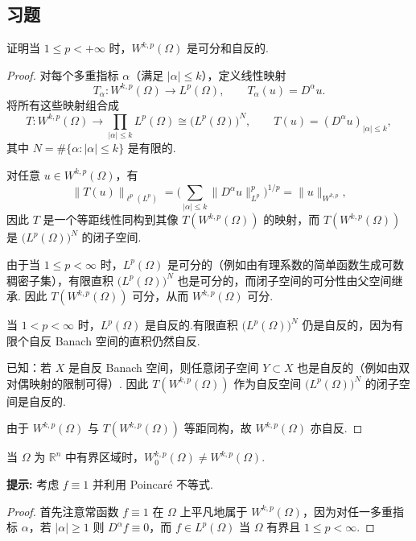 \documentclass[lang=cn,newtx,10pt,scheme=chinese,thmcnt=chapter]{elegantbook}
\begin{document}
\subsection{习题}

\begin{problemset}

\item 证明当 \(1 \leqslant p < +\infty\) 时，\({W}^{k,p}(\Omega)\) 是可分和自反的.
\begin{proof}
对每个多重指标 $\alpha$（满足 $|\alpha| \le k$），定义线性映射
\[
T_\alpha : W^{k,p}(\Omega) \to L^p(\Omega), \qquad T_\alpha(u) = D^\alpha u.
\]
将所有这些映射组合成
\[
T : W^{k,p}(\Omega) \to \prod_{|\alpha| \le k} L^p(\Omega) \cong \big(L^p(\Omega)\big)^N, 
\qquad T(u) = (D^\alpha u)_{|\alpha| \le k},
\]
其中 $N = \#\{\alpha : |\alpha| \le k\}$ 是有限的.

对任意 $u \in W^{k,p}(\Omega)$，有
\[
\|T(u)\|_{\ell^p(L^p)} 
= \Big( \sum_{|\alpha| \le k} \| D^\alpha u \|_{L^p}^p \Big)^{1/p} 
= \|u\|_{W^{k,p}},
\]
因此 $T$ 是一个等距线性同构到其像 $T(W^{k,p}(\Omega))$ 的映射，而 $T(W^{k,p}(\Omega))$ 是 $\big(L^p(\Omega)\big)^N$ 的闭子空间.

由于当 $1 \le p < \infty$ 时，$L^p(\Omega)$ 是可分的（例如由有理系数的简单函数生成可数稠密子集），有限直积 $\big(L^p(\Omega)\big)^N$ 也是可分的，而闭子空间的可分性由父空间继承.  
因此 $T(W^{k,p}(\Omega))$ 可分，从而 $W^{k,p}(\Omega)$ 可分.

当 $1 < p < \infty$ 时，$L^p(\Omega)$ 是自反的.有限直积 $\big(L^p(\Omega)\big)^N$ 仍是自反的，因为有限个自反 Banach 空间的直积仍然自反.

已知：若 $X$ 是自反 Banach 空间，则任意闭子空间 $Y \subset X$ 也是自反的（例如由双对偶映射的限制可得）.  
因此 $T(W^{k,p}(\Omega))$ 作为自反空间 $\big(L^p(\Omega)\big)^N$ 的闭子空间是自反的.

由于 $W^{k,p}(\Omega)$ 与 $T(W^{k,p}(\Omega))$ 等距同构，故 $W^{k,p}(\Omega)$ 亦自反.
\end{proof}
\item 当 \(\Omega\) 为 \({\mathbb{R}}^{n}\) 中有界区域时，\({W}_{0}^{k,p}(\Omega) \neq {W}^{k,p}(\Omega)\).

\textbf{提示:} 考虑 \(f \equiv 1\) 并利用 Poincaré 不等式.
\begin{proof}
  首先注意常函数 $f\equiv 1$ 在 $\Omega$ 上平凡地属于 $W^{k,p}(\Omega)$，因为对任一多重指标 $\alpha$，若 $|\alpha|\ge1$ 则 $D^\alpha f\equiv0$，而 $f\in L^p(\Omega)$ 当 $\Omega$ 有界且 $1\le p<\infty$.


\end{proof}
\end{problemset}
\end{document}
